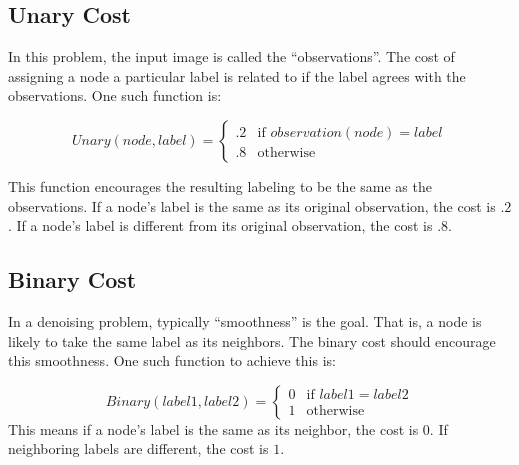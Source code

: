 \documentclass[a4paper,10pt]{article}
\begin{document}
\subsection{Unary Cost}
In this problem, the input image is called the ``observations''. The cost of assigning a node a particular label is related to if the label agrees with the observations. One such function is:

\begin{equation}
Unary(node, label) = 
\begin{cases} 
.2 & \text{if } observation(node) = label
\\
.8 & \text{otherwise }
\end{cases}
\end{equation}

This function encourages the resulting labeling to be the same as the observations.  If a node's label is the same as its original observation, the cost is $.2$. If a node's label is different from its original observation, the cost is $.8$.

\subsection{Binary Cost}
In a denoising problem, typically ``smoothness'' is the goal. That is, a node is likely to take the same label as its neighbors. The binary cost should encourage this  smoothness. One such function to achieve this is:

\begin{equation}
Binary(label1, label2) = 
\begin{cases} 
0 & \text{if } label1 = label2
\\
1 &\text{otherwise}
\end{cases}
\end{equation}
This means if a node's label is the same as its neighbor, the cost is $0$. If neighboring labels are different, the cost is $1$.
\end{document}
